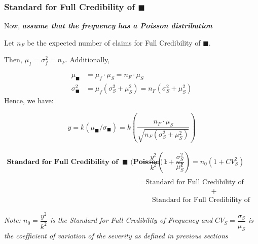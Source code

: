 \documentclass[
]{article}
\begin{document}
\begin{purple}

\hypertarget{standard-for-full-credibility-of-blacksquare}{%
\subsubsection{\texorpdfstring{Standard for Full Credibility of
\(\blacksquare\)}{Standard for Full Credibility of \textbackslash blacksquare}}\label{standard-for-full-credibility-of-blacksquare}}

Now, \textbf{\emph{assume that the frequency has a Poisson
distribution}}

Let \(n_F\) be the expected number of claims for Full Credibility of
\(\blacksquare\).

Then, \(\mu_f = \sigma_f^2 = n_F\). Additionally,

\[
  \begin{align}
    \mu_\blacksquare &= \mu_f \cdot \mu_S = n_F \cdot \mu_S \\
    \sigma_\blacksquare^2 &= \mu_f(\sigma_S^2 + \mu_S^2) = n_F(\sigma_S^2 + \mu_S^2)
  \end{align}
\] Hence, we have:

\[
    y = k(\mu_\blacksquare/\sigma_\blacksquare) = k\left(\dfrac{n_F \cdot \mu_S}{\sqrt{n_F(\sigma_S^2 + \mu_S^2)}}\right)  
\]

\[
  \begin{align}
    \textbf{Standard for Full Credibility of } \ \blacksquare \textbf{ (Poisson) :} \quad \ n_F &= \dfrac{y^2}{k^2}\left(1+ \dfrac{\sigma_S^2}{\mu_S^2} \right) = n_0\left( 1 + CV_S^2 \right) \\ \\
    &= \text{Standard for Full Credibility of Frequency} \\
    & \quad \quad \quad \quad \quad \quad \quad \quad \quad \quad + \\
    & \text{ } \quad \text{Standard for Full Credibility of Severity}
  \end{align}
\]

\emph{Note: \(n_0 = \dfrac{y^2}{k^2}\) is the Standard for Full
Credibility of Frequency and \(CV_S = \dfrac{\sigma_S}{\mu_S}\) is the
coefficient of variation of the severity as defined in previous
sections}

\end{purple}
\end{document}
